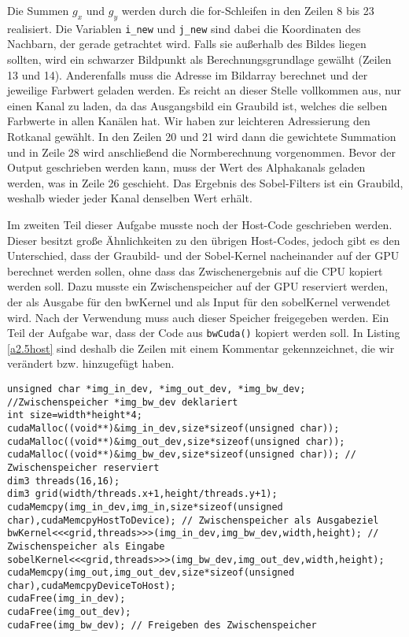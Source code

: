 \documentclass[12pt,a4paper]{scrartcl}
\begin{document}
Die Summen $g_x$ und $g_y$ werden durch die for-Schleifen in den Zeilen 8 bis 23 realisiert.
Die Variablen \texttt{i\_new} und \texttt{j\_new} sind dabei die Koordinaten des Nachbarn, der gerade getrachtet wird.
Falls sie au\ss erhalb des Bildes liegen sollten, wird ein schwarzer Bildpunkt als Berechnungsgrundlage gew\"alht (Zeilen 13 und 14).
Anderenfalls muss die Adresse im Bildarray berechnet und der jeweilige Farbwert geladen werden.
Es reicht an dieser Stelle vollkommen aus, nur einen Kanal zu laden, da das Ausgangsbild ein Graubild ist, welches die selben Farbwerte in allen Kan\"alen hat.
Wir haben zur leichteren Adressierung den Rotkanal gew\"ahlt.
In den Zeilen 20 und 21 wird dann die gewichtete Summation und in Zeile 28 wird anschlie\ss end die Normberechnung vorgenommen.
Bevor der Output geschrieben werden kann, muss der Wert des Alphakanals geladen werden, was in Zeile 26 geschieht.
Das Ergebnis des Sobel-Filters ist ein Graubild, weshalb wieder jeder Kanal denselben Wert erh\"alt.

Im zweiten Teil dieser Aufgabe musste noch der Host-Code geschrieben werden.
Dieser besitzt gro\ss e \"Ahnlichkeiten zu den \"ubrigen Host-Codes, jedoch gibt es den Unterschied, dass der Graubild- und der Sobel-Kernel nacheinander auf der GPU berechnet werden sollen, ohne dass das Zwischenergebnis auf die CPU kopiert werden soll.
Dazu musste ein Zwischenspeicher auf der GPU reserviert werden, der als Ausgabe f\"ur den bwKernel und als Input f\"ur den sobelKernel verwendet wird.
Nach der Verwendung muss auch dieser Speicher freigegeben werden.
Ein Teil der Aufgabe war, dass der Code aus \texttt{bwCuda()} kopiert werden soll.
In Listing \ref{a2.5host} sind deshalb die Zeilen mit einem Kommentar gekennzeichnet, die wir ver\"andert bzw. hinzugef\"ugt haben.

\begin{lstlisting}[caption=sobelCuda,label=a2.5host,breaklines=true]
unsigned char *img_in_dev, *img_out_dev, *img_bw_dev; //Zwischenspeicher *img_bw_dev deklariert
int size=width*height*4;
cudaMalloc((void**)&img_in_dev,size*sizeof(unsigned char));
cudaMalloc((void**)&img_out_dev,size*sizeof(unsigned char));
cudaMalloc((void**)&img_bw_dev,size*sizeof(unsigned char)); // Zwischenspeicher reserviert
dim3 threads(16,16);
dim3 grid(width/threads.x+1,height/threads.y+1);
cudaMemcpy(img_in_dev,img_in,size*sizeof(unsigned char),cudaMemcpyHostToDevice); // Zwischenspeicher als Ausgabeziel
bwKernel<<<grid,threads>>>(img_in_dev,img_bw_dev,width,height); // Zwischenspeicher als Eingabe
sobelKernel<<<grid,threads>>>(img_bw_dev,img_out_dev,width,height);
cudaMemcpy(img_out,img_out_dev,size*sizeof(unsigned char),cudaMemcpyDeviceToHost);
cudaFree(img_in_dev);
cudaFree(img_out_dev);
cudaFree(img_bw_dev); // Freigeben des Zwischenspeicher
\end{lstlisting}
\end{document}
